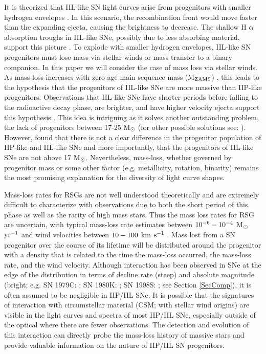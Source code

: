 \documentclass[a4paper,fleqn,usenatbib]{mnras}
\newcommand{\msun}{M$\rm{_{\odot}}$ }
\newcommand{\msunperiod}{M$\rm{_{\odot}}$}
\begin{document}
It is theorized that IIL-like SN light curves arise from progenitors with  smaller hydrogen envelopes \citep{1971grassberg,1989branch,1993blinnikov}.
In this scenario, the recombination front would move faster than the expanding ejecta, causing the brightness to decrease. 
The shallow H $\rm{\alpha}$ absorption troughs in IIL-like SNe, possibly due to less absorbing material, support this picture \citep{1996schlegel,2014gutierrez}.
To explode with smaller hydrogen envelopes, IIL-like SN progenitors must lose mass via stellar winds or mass transfer to a binary companion.
In this paper we will consider the case of mass loss via stellar winds.
As mass-loss increases with zero age main sequence mass (M$\rm{_{ZAMS}}$)  \citep{2003heger,2009kasen}, this leads to the hypothesis that the progenitors of IIL-like SNe are more massive than IIP-like progenitors. 
Observations that IIL-like SNe have shorter periods before falling to the radioactive decay phase, are brighter, and have higher velocity ejecta support this hypothesis \citep{1994patat,2014gutierrez,2014anderson,2014faran,2015sanders,2015valenti,2016valenti}.
This idea is intriguing as it solves another outstanding problem, the lack of progenitors between 17-25 \msun \citep{2015smartt} (for other possible solutions see: \citealt{2018davies, 2012walmswell}).
However, \citet{2016valenti} found that there is not a clear difference in the progenitor population of IIP-like and IIL-like SNe and more importantly, that the progenitors of IIL-like SNe are not above 17 \msunperiod.
Nevertheless, mass-loss, whether governed by progenitor mass or some other factor (e.g. metallicity, rotation, binarity) remains the most promising explanation for the diversity of light curve shapes.

Mass-loss rates for RSGs are not well understood theoretically and are extremely difficult to characterize with observations due to both the short period of this phase as well as the rarity of high mass stars.
Thus the mass loss rates for RSG are uncertain, with typical mass-loss rate estimates between $\rm{10^{-6}-10^{-4}}$ \msunperiod $\rm{yr^{-1}}$ and wind velocities between $\rm{10-100}$ km $\rm{s^{-1}}$ \citep{2011mauron}.
Mass lost from a SN progenitor over the course of its lifetime will be distributed around the progenitor with a density that is related to the time the mass-loss occurred, the mass-loss rate, and the wind velocity.
Although interaction has been observed in SNe at the edge of the distribution in terms of decline rate (steep) and absolute magnitude (bright; e.g. SN 1979C: \citealt{1993blinnikov}; SN 1980K: \citealt{1992chugai}; SN 1998S: \citealt{2001chugai}; see Section \ref{SecComp}), it is often assumed to be negligible in IIP/IIL SNe.
It is possible that the signatures of interaction with circumstellar material (CSM; with stellar wind origins) are visible in the light curves and spectra of most IIP/IIL SNe, especially outside of the optical where there are fewer observations.
The detection and evolution of this interaction can directly probe the mass-loss history of massive stars and provide valuable information on the nature of IIP/IIL SN progenitors.
\end{document}
